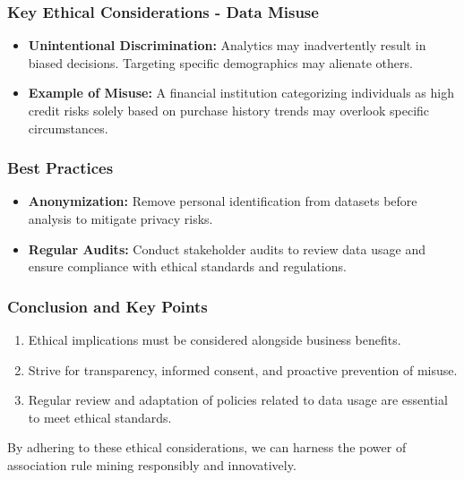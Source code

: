 \documentclass{beamer}
\begin{document}
\begin{frame}[fragile]
    \frametitle{Key Ethical Considerations - Data Misuse}
    \begin{itemize}
        \item \textbf{Unintentional Discrimination:} Analytics may inadvertently result in biased decisions. Targeting specific demographics may alienate others.
        
        \item \textbf{Example of Misuse:} A financial institution categorizing individuals as high credit risks solely based on purchase history trends may overlook specific circumstances.
    \end{itemize}
\end{frame}

\begin{frame}[fragile]
    \frametitle{Best Practices}
    \begin{itemize}
        \item \textbf{Anonymization:} Remove personal identification from datasets before analysis to mitigate privacy risks.
        
        \item \textbf{Regular Audits:} Conduct stakeholder audits to review data usage and ensure compliance with ethical standards and regulations.
    \end{itemize}
\end{frame}

\begin{frame}[fragile]
    \frametitle{Conclusion and Key Points}
    \begin{enumerate}
        \item Ethical implications must be considered alongside business benefits.
        \item Strive for transparency, informed consent, and proactive prevention of misuse.
        \item Regular review and adaptation of policies related to data usage are essential to meet ethical standards.
    \end{enumerate}
    By adhering to these ethical considerations, we can harness the power of association rule mining responsibly and innovatively.
\end{frame}
\end{document}
